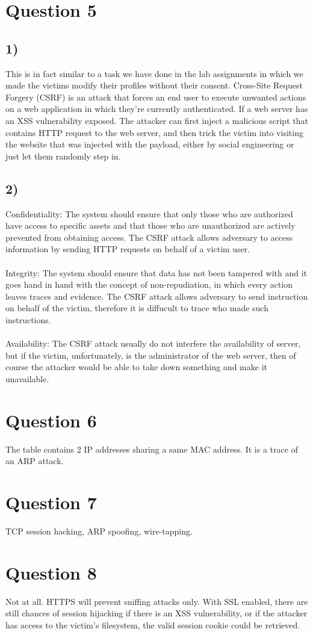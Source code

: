 \documentclass[a4paper]{article}
\begin{document}
\section*{Question 5}
\subsection*{1)}
This is in fact similar to a task we have done in the lab assignments in which we made the victims modify their profiles without their consent. Cross-Site Request Forgery (CSRF) is an attack that forces an end user to execute unwanted actions on a web application in which they’re currently authenticated. If a web server has an XSS vulnerability exposed. The attacker can first inject a malicious script that contains HTTP request to the web server, and then trick the victim into visiting the website that was injected with the payload, either by social engineering or just let them randomly step in.
\subsection*{2)}
Confidentiality: The system should ensure that only those who are authorized have access to specific assets and that those who are unauthorized are actively prevented from obtaining access. The CSRF attack allows adversary to access information by sending HTTP requests on behalf of a victim user.\\\\
Integrity: The system should ensure that data has not been tampered with and it goes hand in hand with the concept of non-repudiation, in which every action leaves traces and evidence. The CSRF attack allows adversary to send instruction on behalf of the victim, therefore it is diffucult to trace who made such instructions.\\\\
Availability: The CSRF attack usually do not interfere the availability of server, but if the victim, unfortunately, is the administrator of the web server, then of course the attacker would be able to take down something and make it unavailable.
\section*{Question 6}
The table contains 2 IP addresses sharing a same MAC address. It is a trace of an ARP attack.
\section*{Question 7}
TCP session hacking, ARP spoofing, wire-tapping.
\section*{Question 8}
Not at all. HTTPS will prevent sniffing attacks only. With SSL enabled, there are still chances of session hijacking if there is an XSS vulnerability, or if the attacker has access to the victim's filesystem, the valid session cookie could be retrieved.
\end{document}
